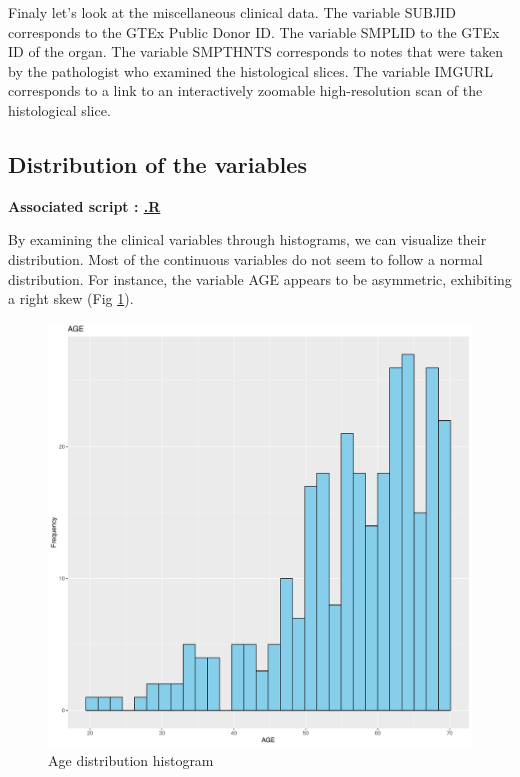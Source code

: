 \documentclass[a4paper, 11pt]{article}
\begin{document}
\begin{multicols}{2}
Finaly let's look at the miscellaneous clinical data. 
The variable SUBJID corresponds to the GTEx Public Donor ID. 
The variable SMPLID to the GTEx ID of the organ. 
The variable SMPTHNTS corresponds to notes that were taken by the pathologist who examined the histological slices. 
The variable IMGURL corresponds to a link to an interactively zoomable high-resolution scan of the histological slice. 
\subsection{Distribution of the variables}

\begin{scriptsize}	
	
	\textbf{Associated script : \href{https://github.com/leopoldguyot/BINF-F401-Project/*}{.R}}
\end{scriptsize}

By examining the clinical variables through histograms, we can visualize their distribution. 
Most of the continuous variables do not seem to follow a normal distribution. 
For instance, the variable AGE appears to be asymmetric, exhibiting a right skew (Fig \ref{fig:ageDistrib}).

\begin{figure}[H]
	\centering
	\includegraphics[width=\columnwidth]{figures/clinical_data_var_dist/AGE}
	\caption{Age distribution histogram }
	\label{fig:ageDistrib}
\end{figure}


\end{multicols}
\end{document}

